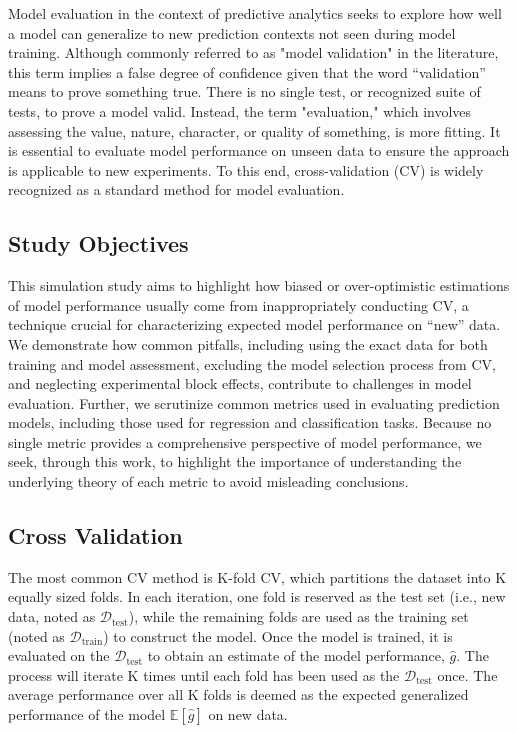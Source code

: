 Model evaluation in the context of predictive analytics seeks to explore how well a model can generalize to new prediction contexts not seen during model training. Although commonly referred to as "model validation" in the literature, this term implies a false degree of confidence given that the word “validation” means to prove something true. There is no single test, or recognized suite of tests, to prove a model valid. Instead, the term "evaluation," which involves assessing the value, nature, character, or quality of something, is more fitting. It is essential to evaluate model performance on unseen data to ensure the approach is applicable to new experiments. To this end, cross-validation (CV) is widely recognized as a standard method for model evaluation.

\subsection{Study Objectives}

This simulation study aims to highlight how biased or over-optimistic estimations of model performance usually come from inappropriately conducting CV, a technique crucial for characterizing expected model performance on “new” data. We demonstrate how common pitfalls, including using the exact data for both training and model assessment, excluding the model selection process from CV, and neglecting experimental block effects, contribute to challenges in model evaluation. Further, we scrutinize common metrics used in evaluating prediction models, including those used for regression and classification tasks. Because no single metric provides a comprehensive perspective of model performance, we seek, through this work, to highlight the importance of understanding the underlying theory of each metric to avoid misleading conclusions.

\subsection{Cross Validation}

The most common CV method is K-fold CV, which partitions the dataset into K equally sized folds. In each iteration, one fold is reserved as the test set (i.e., new data, noted as $\mathcal{D}_{\text{test}}$), while the remaining folds are used as the training set (noted as $\mathcal{D}_{\text{train}}$) to construct the model. Once the model is trained, it is evaluated on the $\mathcal{D}_{\text{test}}$ to obtain an estimate of the model performance, $\hat{g}$. The process will iterate K times until each fold has been used as the $\mathcal{D}_{\text{test}}$ once. The average performance over all K folds is deemed as the expected generalized performance of the model $\mathbb{E}[\hat{g}]$ on new data.


